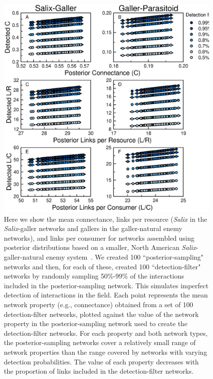 \documentclass[12pt]{article}
\begin{document}
    \begin{figure}[ht]
    \caption{Here we show the mean connectance, links per resource (\emph{Salix} in the \emph{Salix}-galler networks and gallers in the galler-natural enemy networks), and links per consumer for networks assembled using posterior distributions based on a smaller, North American \emph{Salix}-galler-natural enemy system~\citep{Barbour2016,Barbour2016Dryad}. We created 100 ``posterior-sampling" networks and then, for each of these, created 100 ``detection-filter" networks by randomly sampling 50\%-99\% of the interactions included in the posterior-sampling network. This simulates imperfect detection of interactions in the field. Each point represents the mean network property (e.g., connectance) obtained from a set of 100 detection-filter networks, plotted against the value of the network property in the posterior-sampling network used to create the detection-filter networks. For each property and both network types, the posterior-sampling networks cover a relatively small range of network properties than the range covered by networks with varying detection probabilities. The value of each property decreases with the proportion of links included in the detection-filter networks.}
    \label{posterior_webs}    
    \includegraphics[width=.8\textwidth]{Figures/Salix_Galler_posterior_properties.eps}
    \end{figure}



\clearpage

     
\end{document}
